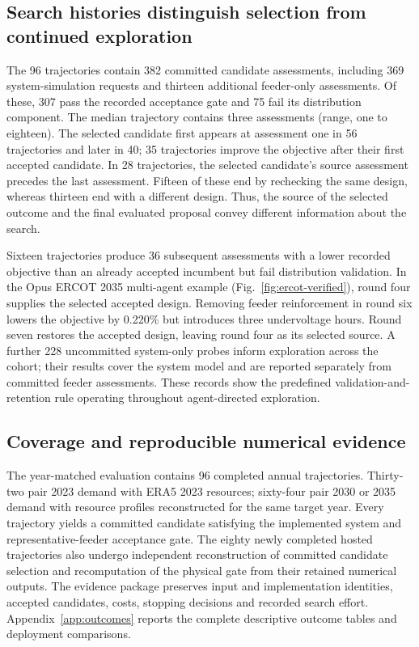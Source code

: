 \documentclass[pdflatex,sn-nature]{sn-jnl}
\begin{document}
\begin{appendices}
\subsection{Search histories distinguish selection from continued exploration}\label{sec:search-process}

The 96 trajectories contain 382 committed candidate assessments, including 369 system-simulation requests and thirteen additional feeder-only assessments. Of these, 307 pass the recorded acceptance gate and 75 fail its distribution component. The median trajectory contains three assessments (range, one to eighteen). The selected candidate first appears at assessment one in 56 trajectories and later in 40; 35 trajectories improve the objective after their first accepted candidate. In 28 trajectories, the selected candidate's source assessment precedes the last assessment. Fifteen of these end by rechecking the same design, whereas thirteen end with a different design. Thus, the source of the selected outcome and the final evaluated proposal convey different information about the search.

Sixteen trajectories produce 36 subsequent assessments with a lower recorded objective than an already accepted incumbent but fail distribution validation. In the Opus ERCOT 2035 multi-agent example (Fig.~\ref{fig:ercot-verified}), round four supplies the selected accepted design. Removing feeder reinforcement in round six lowers the objective by 0.220\% but introduces three undervoltage hours. Round seven restores the accepted design, leaving round four as its selected source. A further 228 uncommitted system-only probes inform exploration across the cohort; their results cover the system model and are reported separately from committed feeder assessments. These records show the predefined validation-and-retention rule operating throughout agent-directed exploration.

\subsection{Coverage and reproducible numerical evidence}\label{sec:coverage}

The year-matched evaluation contains 96 completed annual trajectories. Thirty-two pair 2023 demand with ERA5 2023 resources; sixty-four pair 2030 or 2035 demand with resource profiles reconstructed for the same target year. Every trajectory yields a committed candidate satisfying the implemented system and representative-feeder acceptance gate. The eighty newly completed hosted trajectories also undergo independent reconstruction of committed candidate selection and recomputation of the physical gate from their retained numerical outputs. The evidence package preserves input and implementation identities, accepted candidates, costs, stopping decisions and recorded search effort. Appendix~\ref{app:outcomes} reports the complete descriptive outcome tables and deployment comparisons.


\end{appendices}
\end{document}
